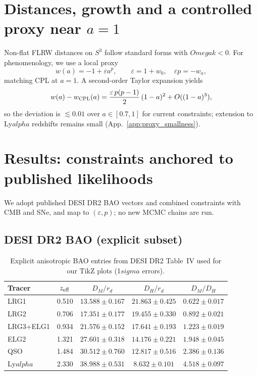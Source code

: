\documentclass[aps,prd,twocolumn,amsmath,amssymb,nofootinbib,superscriptaddress]{revtex4-2}
\def\mathcal#1{#1}%
\def\Ok{Omega k}%
\def\alpha{alpha}\def\beta{beta}\def\gamma{gamma}%
\def\Omega{Omega}\def\sigma{sigma}\def\chi{chi}\def\ell{ell}%
\newcommand{\Ok}{\Omega_k}
\begin{document}
\section{Distances, growth and a controlled proxy near $a=1$}
Non-flat FLRW distances on $S^3$ follow standard forms with $\Ok<0$. For phenomenology, we use a local proxy
\begin{equation}
w(a)=-1+\varepsilon a^p,\qquad \varepsilon=1+w_0,\quad \varepsilon p=-w_a,
\end{equation}
matching CPL at $a=1$. A second-order Taylor expansion yields
\begin{equation}
w(a)-w_{\rm CPL}(a)=\frac{\varepsilon\,p(p-1)}{2}\,(1-a)^2+\mathcal{O}((1-a)^3),
\end{equation}
so the deviation is $\lesssim0.01$ over $a\in[0.7,1]$ for current constraints; extension to Ly$\alpha$ redshifts remains small (App.~\ref{app:proxy_smallness}).

\section{Results: constraints anchored to published likelihoods}
\label{sec:results}
We adopt published DESI DR2 BAO vectors and combined constraints with CMB and SNe, and map to $(\varepsilon,p)$; no new MCMC chains are run.

\subsection{DESI DR2 BAO (explicit subset)}
\begin{table}[t]
\begingroup\small
\centering
\caption{Explicit anisotropic BAO entries from DESI DR2 Table~IV used for our TikZ plots (1$\sigma$ errors).}
\label{tab:desi_explicit}
\begin{tabular}{lcccc}
\toprule
Tracer & $z_{\rm eff}$ & $D_M/r_d$ & $D_H/r_d$ & $D_M/D_H$ \\
\midrule
LRG1 & 0.510 & $13.588 \pm 0.167$ & $21.863 \pm 0.425$ & $0.622 \pm 0.017$ \\
LRG2 & 0.706 & $17.351 \pm 0.177$ & $19.455 \pm 0.330$ & $0.892 \pm 0.021$ \\
LRG3+ELG1 & 0.934 & $21.576 \pm 0.152$ & $17.641 \pm 0.193$ & $1.223 \pm 0.019$ \\
ELG2 & 1.321 & $27.601 \pm 0.318$ & $14.176 \pm 0.221$ & $1.948 \pm 0.045$ \\
QSO & 1.484 & $30.512 \pm 0.760$ & $12.817 \pm 0.516$ & $2.386 \pm 0.136$ \\
Ly$\alpha$ & 2.330 & $38.988 \pm 0.531$ & $8.632 \pm 0.101$ & $4.518 \pm 0.097$ \\
\bottomrule
\end{tabular}
\endgroup
\end{table}
\end{document}
